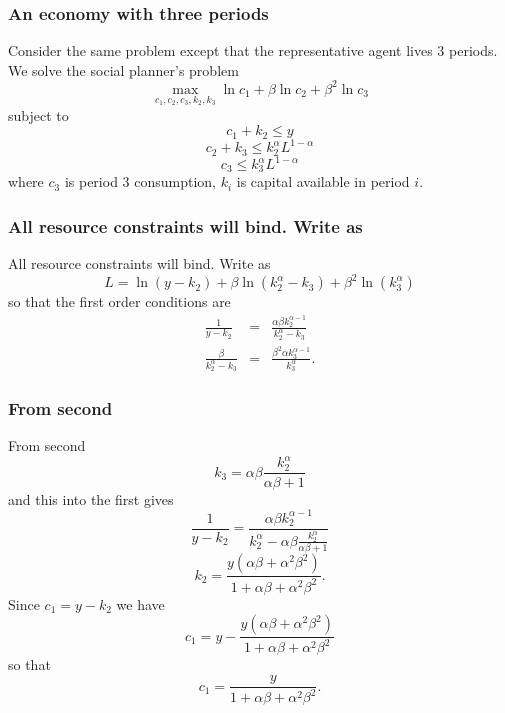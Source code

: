 \documentclass[aspectratio=169]{ltx-talk}
\begin{document}
\begin{frame}
\frametitle{An economy with three periods}
Consider the same problem except that the representative agent lives 3
periods. We solve the social planner's problem%
\begin{equation*}
\underset{c_{1},c_{2},c_{3},k_{2},k_{3}}{\max }\ln c_{1}+\beta \ln
c_{2}+\beta ^{2}\ln c_{3}
\end{equation*}%
subject to%
\begin{equation*}
c_{1}+k_{2}\leq y
\end{equation*}%
\begin{equation*}
c_{2}+k_{3}\leq k_{2}^{\alpha }L^{1-\alpha }
\end{equation*}%
\begin{equation*}
c_{3}\leq k_{3}^{\alpha }L^{1-\alpha }
\end{equation*}%
where $c_{3}$ is period 3 consumption, $k_{i}$ is capital available in
period $i$.
\end{frame}

\begin{frame}
\frametitle{All resource constraints will bind. Write as}
All resource constraints will bind. Write as 
\begin{equation*}
L=\ln \left( y-k_{2}\right) +\beta \ln \left( k_{2}^{\alpha }-k_{3}\right)
+\beta ^{2}\ln \left( k_{3}^{\alpha }\right)
\end{equation*}%
so that the first order conditions are%
\begin{eqnarray*}
\frac{1}{y-k_{2}} &=&\frac{\alpha \beta k_{2}^{\alpha -1}}{k_{2}^{\alpha
}-k_{3}} \\
\frac{\beta }{k_{2}^{\alpha }-k_{3}} &=&\frac{\beta ^{2}\alpha k_{3}^{\alpha
-1}}{k_{3}^{\alpha }}.
\end{eqnarray*}%
\end{frame}

\begin{frame}
\frametitle{From second}
From second 
\begin{equation*}
k_{3}=\alpha \beta \frac{k_{2}^{\alpha }}{\alpha \beta +1}
\end{equation*}%
and this into the first gives 
\begin{equation*}
\frac{1}{y-k_{2}}=\frac{\alpha \beta k_{2}^{\alpha -1}}{k_{2}^{\alpha
}-\alpha \beta \frac{k_{2}^{\alpha }}{\alpha \beta +1}}
\end{equation*}%
\begin{equation*}
k_{2}=\frac{y\left( \alpha \beta +\alpha ^{2}\beta ^{2}\right) }{1+\alpha
\beta +\alpha ^{2}\beta ^{2}}.
\end{equation*}%
Since $c_{1}=y-k_{2}$ we have%
\begin{equation*}
c_{1}=y-\frac{y\left( \alpha \beta +\alpha ^{2}\beta ^{2}\right) }{1+\alpha
\beta +\alpha ^{2}\beta ^{2}}
\end{equation*}%
so that 
\begin{equation*}
c_{1}=\frac{y}{1+\alpha \beta +\alpha ^{2}\beta ^{2}}.
\end{equation*}%
\end{frame}
\end{document}
